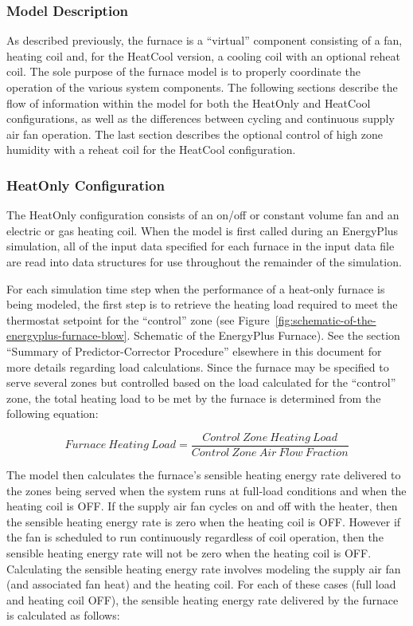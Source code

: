 \subsubsection{Model Description}\label{model-description-1}

As described previously, the furnace is a ``virtual'' component consisting of a fan, heating coil and, for the HeatCool version, a cooling coil with an optional reheat coil. The sole purpose of the furnace model is to properly coordinate the operation of the various system components. The following sections describe the flow of information within the model for both the HeatOnly and HeatCool configurations, as well as the differences between cycling and continuous supply air fan operation. The last section describes the optional control of high zone humidity with a reheat coil for the HeatCool configuration.

\subsubsection{HeatOnly Configuration}\label{heatonly-configuration}

The HeatOnly configuration consists of an on/off or constant volume fan and an electric or gas heating coil. When the model is first called during an EnergyPlus simulation, all of the input data specified for each furnace in the input data file are read into data structures for use throughout the remainder of the simulation.

For each simulation time step when the performance of a heat-only furnace is being modeled, the first step is to retrieve the heating load required to meet the thermostat setpoint for the ``control'' zone (see Figure~\ref{fig:schematic-of-the-energyplus-furnace-blow}. Schematic of the EnergyPlus Furnace). See the section ``Summary of Predictor-Corrector Procedure'' elsewhere in this document for more details regarding load calculations. Since the furnace may be specified to serve several zones but controlled based on the load calculated for the ``control'' zone, the total heating load to be met by the furnace is determined from the following equation:

\begin{equation}
Furnace~Heating~Load = \frac{{Control~Zone~Heating~Load}}{{Control~Zone~Air~Flow~Fraction}}
\end{equation}

The model then calculates the furnace's sensible heating energy rate delivered to the zones being served when the system runs at full-load conditions and when the heating coil is OFF. If the supply air fan cycles on and off with the heater, then the sensible heating energy rate is zero when the heating coil is OFF. However if the fan is scheduled to run continuously regardless of coil operation, then the sensible heating energy rate will not be zero when the heating coil is OFF. Calculating the sensible heating energy rate involves modeling the supply air fan (and associated fan heat) and the heating coil. For each of these cases (full load and heating coil OFF), the sensible heating energy rate delivered by the furnace is calculated as follows:

